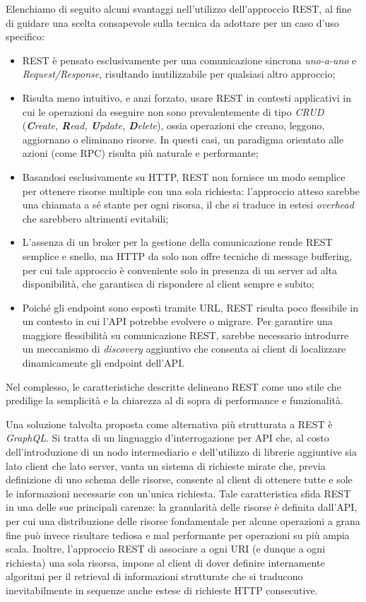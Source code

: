 Elenchiamo di seguito alcuni svantaggi nell'utilizzo dell'approccio REST, al fine di guidare una scelta consapevole sulla tecnica da adottare per un caso d'uso specifico:

\begin{itemize}
	\item REST è pensato esclusivamente per una comunicazione sincrona \emph{uno-a-uno} e \emph{Request/Response}, risultando inutilizzabile per qualsiasi altro approccio;
	\item Risulta meno intuitivo, e anzi forzato, usare REST in contesti applicativi in cui le operazioni da eseguire non sono prevalentemente di tipo \emph{CRUD} (\emph{\textbf{C}reate, \textbf{R}ead, \textbf{U}pdate, \textbf{D}elete}), ossia operazioni che creano, leggono, aggiornano o eliminano risorse. In questi casi, un paradigma orientato alle azioni (come RPC) risulta più naturale e performante;
	\item Basandosi esclusivamente su HTTP, REST non fornisce un modo semplice per ottenere risorse multiple con una sola richiesta: l'approccio atteso sarebbe una chiamata a sé stante per ogni risorsa, il che si traduce in estesi \emph{overhead} che sarebbero altrimenti evitabili;
	\item L'assenza di un broker per la gestione della comunicazione rende REST semplice e snello, ma HTTP da solo non offre tecniche di message buffering, per cui tale approccio è conveniente solo in presenza di un server ad alta disponibilità, che garantisca di rispondere al client sempre e subito;
	\item Poiché gli endpoint sono esposti tramite URL, REST risulta poco flessibile in un contesto in cui l'API potrebbe evolvere o migrare. Per garantire una maggiore flessibilità su comunicazione REST, sarebbe necessario introdurre un meccanismo di \emph{discovery} aggiuntivo che consenta ai client di localizzare dinamicamente gli endpoint dell'API.
\end{itemize}
Nel complesso, le caratteristiche descritte delineano REST come uno stile che predilige la semplicità e la chiarezza al di sopra di performance e funzionalità.

Una soluzione talvolta proposta come alternativa più strutturata a REST è \emph{GraphQL}.
Si tratta di un linguaggio d'interrogazione per API che, al costo dell'introduzione di un nodo intermediario e dell'utilizzo di librerie aggiuntive sia lato client che lato server, vanta un sistema di richieste mirate che, previa definizione di uno schema delle risorse, consente al client di ottenere tutte e sole le informazioni necessarie con un'unica richiesta. Tale caratteristica sfida REST in una delle sue principali carenze: la granularità delle risorse è definita dall'API, per cui una distribuzione delle risorse fondamentale per alcune operazioni a grana fine può invece risultare tediosa e mal performante per operazioni su più ampia scala. Inoltre, l'approccio REST di associare a ogni URI (e dunque a ogni richiesta) una sola risorsa, impone al client di dover definire internamente algoritmi per il retrieval di informazioni strutturate che si traducono inevitabilmente in sequenze anche estese di richieste HTTP consecutive.

